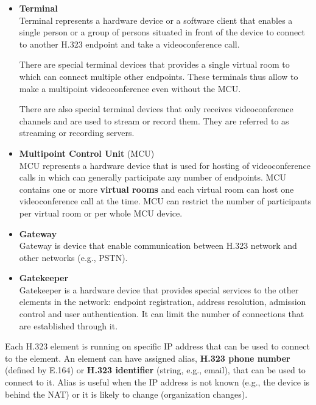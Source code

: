 \documentclass[a4paper]{report}
\begin{document}
\begin{itemize}

\item \textbf{Terminal} \\
Terminal represents a hardware device or a software client that enables a single person or a group of persons situated in front of the device to connect to another H.323 endpoint and take a videoconference call.

There are special terminal devices that provides a single virtual room to which can connect multiple other endpoints.  These terminals thus allow to make a multipoint videoconference even without the MCU.

There are also special terminal devices that only receives videoconference channels and are used to stream or record them. They are referred to as streaming or recording servers.

\item \textbf{Multipoint Control Unit} (MCU) \\
MCU represents a hardware device that is used for hosting of videoconference calls in which can generally participate any number of endpoints. MCU contains one or more \textbf{virtual rooms} and each virtual room can host one videoconference call at the time. MCU can restrict the number of participants per virtual room or per whole MCU device.

\item \textbf{Gateway} \\
Gateway is device that enable communication between H.323 network and other networks (e.g., PSTN).

\item \textbf{Gatekeeper} \\
Gatekeeper is a hardware device that provides special services to the other elements in the network: endpoint registration, address resolution, admission control and user authentication. It can limit the number of connections that are established through it.

\end{itemize}

Each H.323 element is running on specific IP address that can be used to connect to the element. An element can have assigned alias, \textbf{H.323 phone number} (defined by E.164) or \textbf{H.323 identifier} (string, e.g., email), that can be used to connect to it. Alias is useful when the IP address is not known (e.g., the device is behind the NAT) or it is likely to change (organization changes).
\end{document}
